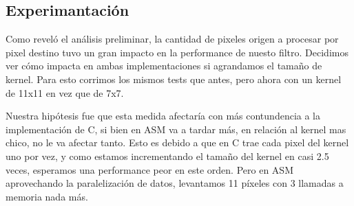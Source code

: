 \subsection{Experimantación}
Como reveló el análisis preliminar, la cantidad de pixeles origen a procesar por pixel destino tuvo un gran impacto en la performance de nuesto filtro. Decidimos ver cómo impacta en ambas implementaciones si agrandamos el tamaño de kernel. Para esto corrimos los mismos tests que antes, pero ahora con un kernel de 11x11 en vez que de 7x7.

Nuestra hipótesis fue que esta medida afectaría con más contundencia a la implementación de C, si bien en ASM va a tardar más, en relación al kernel mas chico, no le va afectar tanto. Esto es debido a que en C trae cada pixel del kernel uno por vez, y como estamos incrementando el tamaño del kernel en casi 2.5 veces, esperamos una performance peor en este orden. Pero en ASM aprovechando la paralelización de datos, levantamos 11 píxeles con 3 llamadas a memoria nada más.


